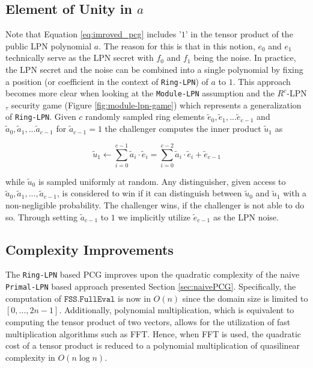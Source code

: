 \subsection{Element of Unity in $a$}
Note that Equation \ref{eq:imroved_pcg} includes '$1$' in the tensor product of the public LPN polynomial $a$. The reason for this is that in this notion, $e_0$ and $e_1$ technically serve as the LPN secret with $f_0$ and $f_1$ being the noise. In practice, the LPN secret and the noise can be combined into a single polynomial by fixing a position (or coefficient in the context of \texttt{Ring-LPN}) of $a$ to $1$. This approach becomes more clear when looking at the \texttt{Module-LPN} assumption and the $R^{c}$-LPN$_{\tau}$ security game (Figure \ref{fig:module-lpn-game}) which represents a generalization of \texttt{Ring-LPN}. Given $c$ randomly sampled ring elements $\tilde{e}_0, \tilde{e}_1, ... \tilde{e}_{c-1}$ and $\tilde{a}_0, \tilde{a}_1, ...\tilde{a}_{c-1}$ for $\tilde{a}_{c-1}=1$  the challenger computes the inner product $\tilde{u}_1$ as

\begin{equation}
\label{eq:inner_product_with_a_1}
\tilde{u}_{1} \leftarrow \sum_{i=0}^{c-1} \tilde{a}_{i} \cdot \tilde{e}_{i} = \sum_{i=0}^{c-2} \tilde{a}_{i} \cdot \tilde{e}_{i} + \tilde{e}_{c-1}
\end{equation}

while $\tilde{u}_0$ is sampled uniformly at random. Any distinguisher, given access to $\tilde{a}_0, \tilde{a}_1, ..., \tilde{a}_{c-1}$, is considered to win if it can distinguish between $\tilde{u}_0$ and $\tilde{u}_1$ with a non-negligible probability. The challenger wins, if the challenger is not able to do so. Through setting $\tilde{a}_{c-1}$ to $1$ we implicitly utilize $\tilde{e}_{c-1}$ as the LPN noise.


\subsection{Complexity Improvements}
\label{subsec:VOLEConstruction}
The \texttt{Ring-LPN} based PCG improves upon the quadratic complexity of the naive \texttt{Primal-LPN} based approach presented Section \ref{sec:naivePCG}. Specifically, the computation of $\texttt{FSS.FullEval}$ is now in $O(n)$ since the domain size is limited to $[0, ..., 2n-1]$. Additionally, polynomial multiplication, which is equivalent to computing the tensor product of two vectors, allows for the utilization of fast multiplication algorithms such as FFT. Hence, when FFT is used, the quadratic cost of a tensor product is reduced to a polynomial multiplication of quasilinear complexity in $O(n \log n)$.

